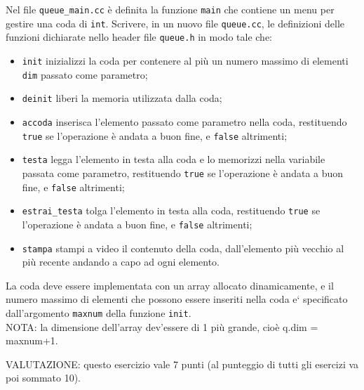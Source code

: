 Nel file {\tt queue\_main.cc} \`e definita la funzione {\tt main} che
contiene un menu per gestire una coda di {\tt int}. 
Scrivere, in un nuovo file {\tt queue.cc}, 
le definizioni delle funzioni dichiarate nello header file \texttt{queue.h} 
in modo tale che:
\begin{itemize}
\item
\texttt{init} inizializzi la coda per contenere al pi\`u un numero massimo di elementi
{\tt dim} passato come parametro;
\item 
\texttt{deinit} liberi la memoria utilizzata dalla coda;
\item
\texttt{accoda} inserisca l'elemento passato come parametro nella coda,
restituendo {\tt true} se l'operazione \`e andata a buon fine, 
e {\tt false} altrimenti;
\item
\texttt{testa} legga l'elemento in testa alla coda e lo memorizzi nella
variabile passata come parametro,
restituendo {\tt true} se l'operazione \`e andata a buon fine,
e {\tt false} altrimenti;
\item
\texttt{estrai\_testa} tolga l'elemento in testa alla coda,
restituendo {\tt true} se l'operazione \`e andata a buon fine, 
e {\tt false} altrimenti;
\item
\texttt{stampa} stampi a video il contenuto della coda, dall'elemento
pi\`u vecchio al pi\`u recente andando a capo ad ogni elemento.
\end{itemize}

La coda deve essere implementata con un array allocato dinamicamente, e il numero
massimo di elementi che possono essere inseriti nella coda e` specificato
dall'argomento {\tt maxnum} della funzione {\tt init}.\\

NOTA: la dimensione dell'array dev'essere di 1 pi\`u grande, cio\`e q.dim = maxnum+1.

VALUTAZIONE:
questo esercizio vale 7 punti 
(al punteggio di tutti gli esercizi va poi sommato 10).
